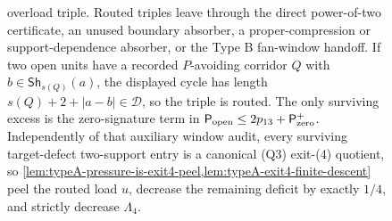 \documentclass[11pt]{article}
\newcommand{\Pow}{\mathcal D}
\newcommand{\Sh}{\mathsf{Sh}}
\begin{document}
\begin{figure}[t]
{overload triple.  Routed triples leave through the direct power-of-two certificate,
an unused boundary absorber, a proper-compression or support-dependence absorber,
or the Type B fan-window handoff.  If two open units have a recorded
\(P\)-avoiding corridor \(Q\) with \(b\in\Sh_{s(Q)}(a)\), the displayed cycle
has length \(s(Q)+2+|a-b|\in\Pow\), so the triple is routed.  The only
surviving excess is the zero-signature term in
\(\mathsf P_{\rm open}\le2p_{13}+\mathsf P_{\rm zero}^{+}\).  Independently of
that auxiliary window audit, every surviving target-defect two-support entry is
a canonical \textup{(Q3)} exit-\textup{(4)} quotient, so
\cref{lem:typeA-pressure-is-exit4-peel,lem:typeA-exit4-finite-descent} peel
the routed load \(u\), decrease the remaining deficit by exactly \(1/4\), and
strictly decrease \(\Lambda_4\).}
\label{fig:exit4-p13-attachment-accounting}
\end{figure}
\end{document}
